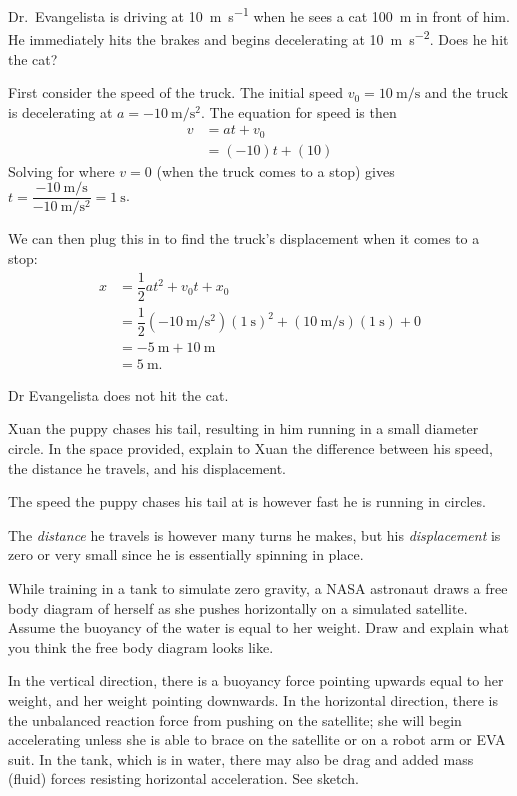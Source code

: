 \documentclass[exam,addpoints, answers]{exam}
\begin{document}
\begin{questions}
\clearpage
\question[23] Dr.~Evangelista is driving at \SI{10}{\meter\per\second} when he sees a cat \SI{100}{\meter} in front of him. He immediately hits the brakes and begins decelerating at \SI{10}{\meter\per\second\squared}. Does he hit the cat? 
\begin{solution}[6in]
First consider the speed of the truck. The initial speed $v_0=\SI{10}{\meter\per\second}$ and the truck is decelerating at $a=\SI{-10}{\meter\per\second\squared}$. The equation for speed is then 
\begin{align}
v &= at + v_0 \\
&= (-10) t + (10) 
\end{align}
Solving for where $v=0$ (when the truck comes to a stop) gives $t=\dfrac{\SI{-10}{\meter\per\second}}{\SI{-10}{\meter\per\second\squared}}=\SI{1}{\second}$. 

We can then plug this in to find the truck's displacement when it comes to a stop:
\begin{align}
x &= \dfrac{1}{2}at^2 + v_0 t + x_0 \\
&= \dfrac{1}{2}(\SI{-10}{\meter\per\second\squared})(\SI{1}{\second})^2 + (\SI{10}{\meter\per\second})(\SI{1}{\second}) + 0 \\
&= \SI{-5}{\meter} + \SI{10}{\meter} \\
&= \SI{5}{\meter}.
\end{align} 

Dr Evangelista does not hit the cat. 
\end{solution}

\clearpage
\question[23] Xuan the puppy chases his tail, resulting in him running in a small diameter circle. In the space provided, explain to Xuan the difference between his speed, the distance he travels, and his displacement. 
\begin{solution}[6in]
The speed the puppy chases his tail at is however fast he is running in circles. 

The \emph{distance} he travels is however many turns he makes, but his \emph{displacement} is zero or very small since he is essentially spinning in place. 
\end{solution}

\clearpage
\question[22] While training in a tank to simulate zero gravity, a NASA astronaut draws a free body diagram of herself as she pushes horizontally on a simulated satellite. Assume the buoyancy of the water is equal to her weight. Draw and explain what you think the free body diagram looks like. 
\begin{solution}[6in]
In the vertical direction, there is a buoyancy force pointing upwards equal to her weight, and her weight pointing downwards. In the horizontal direction, there is the unbalanced reaction force from pushing on the satellite; she will begin accelerating unless she is able to brace on the satellite or on a robot arm or EVA suit. In the tank, which is in water, there may also be drag and added mass (fluid) forces resisting horizontal acceleration. See sketch. 
\end{solution}


\end{questions}
\end{document}

